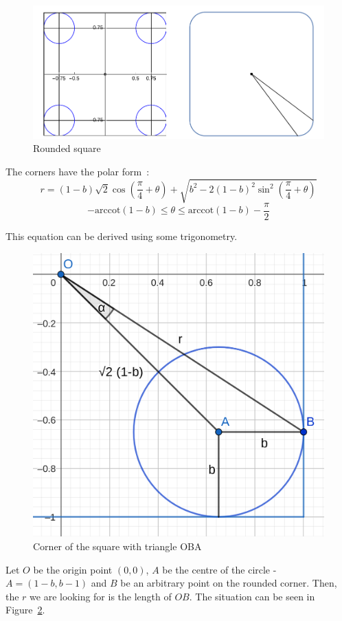 \documentclass[12pt]{article}
\begin{document}
        \begin{figure}[H]
            \centering
            \includegraphics[width=0.9\linewidth]{images/rounded_square.png}
            \caption{Rounded square~\cite{bridge_wolfram}}\label{fig:rounded_square}
        \end{figure}

        The corners have the polar form~\cite{bridge_wolfram}:
        \begin{equation}
            r = (1-b)\sqrt{2} \cos (\frac{\pi}{4} + \theta) + \sqrt{b^2 - 2(1-b)^2 \sin^2 (\frac{\pi}{4}+\theta)}
        \end{equation}
        \[- \text{arccot}(1-b) \leq \theta \leq \text{arccot}(1-b) - \frac{\pi}{2}\]

        This equation can be derived using some trigonometry. 
        \begin{figure}[H]
            \centering \includegraphics[width=0.5\linewidth]{images/corner_cos_rule.png}
            \caption[Corner of the square with triangle OBA]{Corner of the square with triangle OBA\footnotemark}\label{fig:corner_cos_rule}
        \end{figure}

        Let $O$ be the origin point $(0,0)$, $A$ be the centre of the circle - $A =(1-b,b-1)$ and $B$ be an arbitrary point on the rounded corner. Then, the $r$ we are looking for is the length of $OB$. The situation can be seen in Figure~\ref{fig:corner_cos_rule}.
\end{document}
